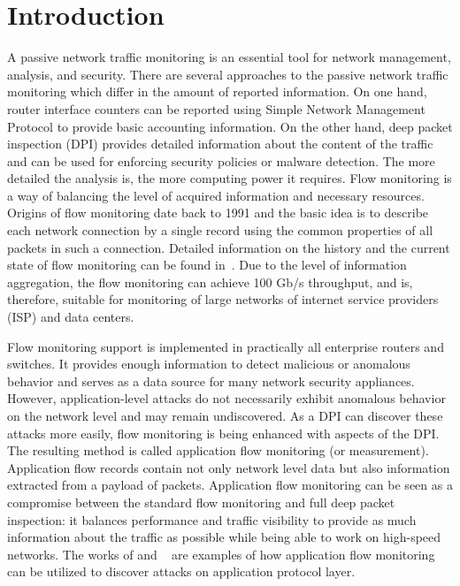 \chapter{Introduction}


A passive network traffic monitoring is an essential tool for network management, analysis, and security. There are several approaches to the passive network traffic monitoring which differ in the amount of reported information. On one hand, router interface counters can be reported using Simple Network Management Protocol to provide basic accounting information. On the other hand, deep packet inspection (DPI) provides detailed information about the content of the traffic and can be used for enforcing security policies or malware detection. The more detailed the analysis is, the more computing power it requires. Flow monitoring is a way of balancing the level of acquired information and necessary resources. Origins of flow monitoring date back to 1991 and the basic idea is to describe each network connection by a single record using the common properties of all packets in such a connection. Detailed information on the history and the current state of flow monitoring can be found in~\cite{Hofstede-2014-Flow}. Due to the level of information aggregation, the flow monitoring can achieve 100\, Gb/s throughput, and is, therefore, suitable for monitoring of large networks of internet service providers (ISP) and data centers.

Flow monitoring support is implemented in practically all enterprise routers and switches. It provides enough information to detect malicious or anomalous behavior and serves as a data source for many network security appliances. However, application-level attacks do not necessarily exhibit anomalous behavior on the network level and may remain undiscovered. As a DPI can discover these attacks more easily, flow monitoring is being enhanced with aspects of the DPI. The resulting method is called application flow monitoring (or measurement). Application flow records contain not only network level data but also information extracted from a payload of packets. Application flow monitoring can be seen as a compromise between the standard flow monitoring and full deep packet inspection: it balances performance and traffic visibility to provide as much information about the traffic as possible while being able to work on high-speed networks. The works of \cite{Cejka-2015-Using} and \citeauthor{Husak-2015-Security}~\cite{Cejka-2015-Using, Husak-2015-Security} are examples of how application flow monitoring can be utilized to discover attacks on application protocol layer.

